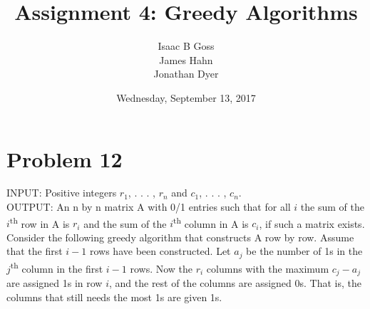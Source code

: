 \documentclass{article}
\author{Isaac B Goss\\ James Hahn\\ Jonathan Dyer}
\title{Assignment 4: Greedy Algorithms}
\date{Wednesday, September 13, 2017}
\providecommand{\prob}[1]{\section*{Problem #1}}
\begin{document}
\maketitle

    \prob{12}
	INPUT: Positive integers $r_1$, . . . , $r_n$ and $c_1$, . . . , $c_n$. \\
	OUTPUT: An n by n matrix A with 0/1 entries such that for all $i$ the sum of the $i$\textsuperscript{th} row in A is $r_i$ and the sum of
	the $i$\textsuperscript{th} column in A is $c_i$, if such a matrix exists. Consider the following greedy algorithm that constructs A row
	by row. Assume that the first $i - 1$ rows have been constructed. Let $a_j$ be the number of 1\textsc{}s in the $j$\textsuperscript{th} column in
	the first $i - 1$ rows. Now the $r_i$ columns with the maximum $c_j - a_j$ are assigned 1\textsc{}s in row $i$, and the rest of the columns
	are assigned 0\textsc{}s. That is, the columns that still needs the most 1\textsc{}s are given 1\textsc{}s.
	
\end{document}

